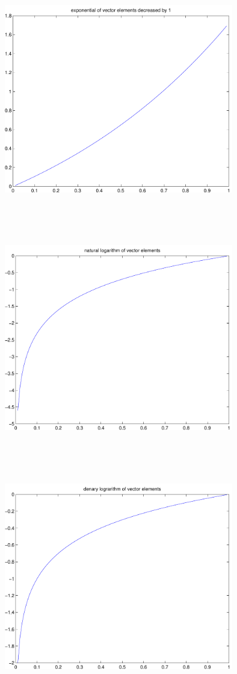 \documentclass[9pt]{article}
\theoremstyle{plain}
\theoremstyle{definition}
\theoremstyle{remark}
\numberwithin{equation}{section}
\begin{document}
\includegraphics[width=10.0cm,height=10.0cm]{klVSLExpm1.pdf}

\includegraphics[width=10.0cm,height=10.0cm]{klVSLLn.pdf}

\includegraphics[width=10.0cm,height=10.0cm]{klVSLLog10.pdf}
\end{document}
